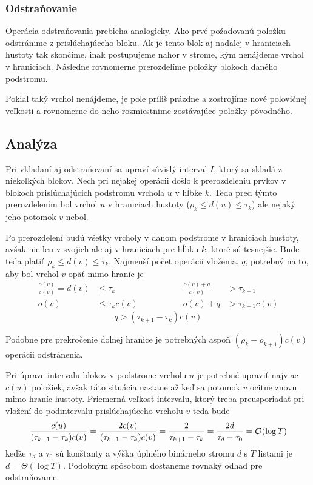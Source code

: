 \subsubsection{Odstraňovanie}

Operácia odstraňovania prebieha analogicky. Ako prvé požadovanú položku odstránime z prislúchajúceho bloku. Ak je tento blok aj naďalej v hraniciach hustoty tak skončíme, inak postupujeme nahor v strome, kým nenájdeme vrchol v hraniciach. Následne rovnomerne prerozdelíme položky blokoch daného podstromu.

Pokiaľ taký vrchol nenájdeme, je pole príliš prázdne a zostrojíme nové polovičnej veľkosti a rovnomerne do neho rozmiestnime zostávajúce položky pôvodného.

\subsection{Analýza}

Pri vkladaní aj odstraňovaní sa upraví súvislý interval $I$, ktorý sa skladá z niekoľkých blokov. Nech pri nejakej operácii došlo k prerozdeleniu prvkov v blokoch prislúchajúcich podstromu vrchola $u$ v hĺbke $k$. Teda pred týmto prerozdelením bol vrchol $u$ v hraniciach hustoty ($\rho_k \le d(u) \le \tau_k$) ale nejaký jeho potomok $v$ nebol.

Po prerozdelení budú všetky vrcholy v danom podstrome v hraniciach hustoty, avšak nie len v svojich ale aj v hraniciach pre hĺbku $k$, ktoré sú tesnejšie. Bude teda platiť $\rho_k \le d(v) \le \tau_k$. Najmenší počet operácii vloženia, $q$, potrebný na to, aby bol vrchol $v$ opäť mimo hraníc je
\[
\begin{aligned}
\frac{o(v)}{c(v)} = d(v) &\le \tau_k \hspace{3cm} & \frac{o(v)+q}{c(v)} &> \tau_{k+1} \\
o(v) &\le \tau_k c(v) & o(v)+q &> \tau_{k+1}c(v)
\end{aligned}
\]\[
q > (\tau_{k+1}-\tau_k)c(v)
\]

Podobne pre prekročenie dolnej hranice je potrebných aspoň $(\rho_k-\rho_{k+1})c(v)$ operácii odstránenia.

Pri úprave intervalu blokov v podstrome vrcholu $u$ je potrebné upraviť najviac $c(u)$ položiek, avšak táto situácia nastane až keď sa potomok $v$ ocitne znovu mimo hraníc hustoty. Priemerná veľkosť intervalu, ktorý treba preusporiadať pri vložení do podintervalu prislúchajúceho vrcholu $v$ teda bude
\[
\frac{c(u)}{(\tau_{k+1}-\tau_k)c(v)} = \frac{2c(v)}{(\tau_{k+1}-\tau_k)c(v)} = \frac{2}{\tau_{k+1}-\tau_k} = \frac{2d}{\tau_d-\tau_0} = \mathcal{O}(\log{T})
\]
keďže $\tau_d$ a $\tau_0$ sú konštanty a výška úplného binárneho stromu $d$ s $T$ listami je $d = \Theta(\log{T})$. Podobným spôsobom dostaneme rovnaký odhad pre odstraňovanie.

